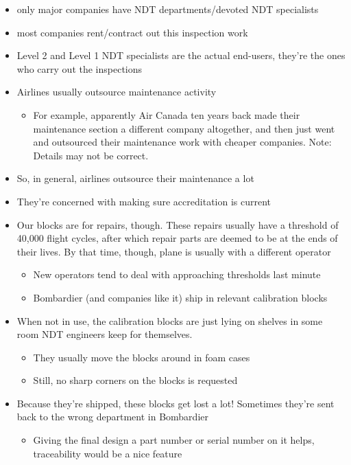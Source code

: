 \documentclass[12pt]{article}
\begin{document}
\begin{itemize}
\item only major companies have NDT departments/devoted NDT specialists
\item most companies rent/contract out this inspection work
\item Level 2 and Level 1 NDT specialists are the actual end-users, they're the ones who carry out the inspections
\item Airlines usually outsource maintenance activity
\begin{itemize}
\item For example, apparently Air Canada ten years back made their maintenance section a different company altogether, and then just went and outsourced their maintenance work with cheaper companies. Note: Details may not be correct. 
\end{itemize}
\item So, in general, airlines outsource their maintenance a lot
\item They're concerned with making sure accreditation is current
\item Our blocks are for repairs, though. These repairs usually have a threshold of 40,000 flight cycles, after which repair parts are deemed to be at the ends of their lives. By that time, though, plane is usually with a different operator
\begin{itemize}
\item New operators tend to deal with approaching thresholds last minute
\item Bombardier (and companies like it) ship in relevant calibration blocks
\end{itemize}
\item When not in use, the calibration blocks are just lying on shelves in some room NDT engineers keep for themselves.
\begin{itemize}
\item They usually move the blocks around in foam cases
\item Still, no sharp corners on the blocks is requested
\end{itemize}
\item Because they're shipped, these blocks get lost a lot! Sometimes they're sent back to the wrong department in Bombardier
\begin{itemize}
\item  Giving the final design a part number or serial number on it helps, traceability would be a nice feature
\end{itemize}
\end{itemize}
\end{document}
